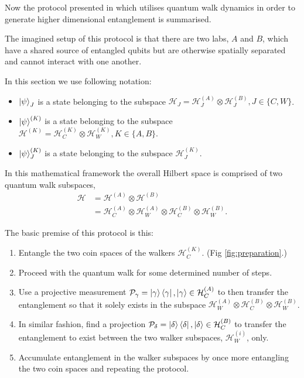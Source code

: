 Now the protocol presented in \cite{giordani2020} which utilises quantum walk dynamics in order to generate higher dimensional entanglement is summarised.

The imagined setup of this protocol is that there are two labs, $A$ and $B$, which have a shared source of entangled qubits but are otherwise spatially separated and cannot interact with one another.

In this section we use following notation:
\begin{itemize}
    \item $\ket{\psi}_J$ is a state belonging to the subspace $\mathcal{H}_J = \mathcal{H}^{(A)}_J \otimes \mathcal{H}^{(B)}_J, J\in\{C,W\}$.
    \item $\ket{\psi}^{(K)}$ is a state belonging to the subspace $\mathcal{H}^{(K)} = \mathcal{H}^{(K)}_C \otimes \mathcal{H}^{(K)}_W, K\in\{A,B\}$.
    \item  $\ket{\psi}^{(K)}_J$ is a state belonging to the subspace $\mathcal{H}^{(K)}_J$.
\end{itemize}

In this mathematical framework the overall Hilbert space is comprised of two quantum walk subspaces,
\begin{align}
    \mathcal{H} &= \mathcal{H}^{(A)} \otimes \mathcal{H}^{(B)}\\
                &= \mathcal{H}^{(A)}_C \otimes \mathcal{H}^{(A)}_W \otimes \mathcal{H}^{(B)}_C \otimes \mathcal{H}^{(B)}_W.
\end{align}

The basic premise of this protocol is this:
\begin{enumerate}
    \item Entangle the two coin spaces of the walkers $\mathcal{H}^{(K)}_C$. (Fig \ref{fig:preparation}.)
    \item Proceed with the quantum walk for some determined number of steps.
    \item Use a projective measurement $\mathcal{P}_\gamma = \ket{\gamma}\bra{\gamma}, \ket{\gamma}\in\mathcal{H}^{(A)}_C$ to then transfer the entanglement so that it solely exists in the subspace $\mathcal{H}^{(A)}_W \otimes \mathcal{H}^{(B)}_C \otimes \mathcal{H}^{(B)}_W$.
    \item In similar fashion, find a projection $\mathcal{P}_\delta = \ket{\delta}\bra{\delta}, \ket{\delta}\in\mathcal{H}^{(B)}_C$ to transfer the entanglement to exist between the two walker subspaces, $\mathcal{H}^{(i)}_W$, only.
    \item Accumulate entanglement in the walker subspaces by once more entangling the two coin spaces and repeating the protocol.
\end{enumerate}


